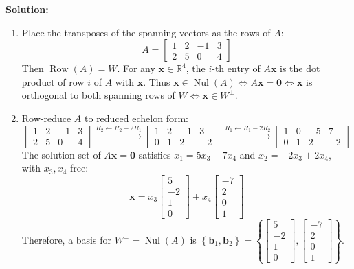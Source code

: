 \documentclass[11pt, letterpaper]{article}
\theoremstyle{definition}
\theoremstyle{remark}
\begin{document}
\textbf{Solution:}
\begin{enumerate}[label=(\alph*)]
    \item Place the transposes of the spanning vectors as the rows of $A$:
    \[
    A = \begin{bmatrix} 1 & 2 & -1 & 3 \\ 2 & 5 & 0 & 4 \end{bmatrix}
    \]
    Then $\operatorname{Row}(A) = W$. For any $\mathbf{x} \in \mathbb{R}^4$, the $i$-th entry of $A\mathbf{x}$ is the dot product of row $i$ of $A$ with $\mathbf{x}$. Thus $\mathbf{x} \in \operatorname{Nul}(A) \iff A\mathbf{x} = \mathbf{0} \iff \mathbf{x}$ is orthogonal to both spanning rows of $W \iff \mathbf{x} \in W^{\perp}$.
    \item Row-reduce $A$ to reduced echelon form:
    \[
    \begin{bmatrix} 1 & 2 & -1 & 3 \\ 2 & 5 & 0 & 4 \end{bmatrix}
    \xrightarrow{R_2 \leftarrow R_2 - 2R_1}
    \begin{bmatrix} 1 & 2 & -1 & 3 \\ 0 & 1 & 2 & -2 \end{bmatrix}
    \xrightarrow{R_1 \leftarrow R_1 - 2R_2}
    \begin{bmatrix} 1 & 0 & -5 & 7 \\ 0 & 1 & 2 & -2 \end{bmatrix}
    \]
    The solution set of $A\mathbf{x} = \mathbf{0}$ satisfies $x_1 = 5x_3 - 7x_4$ and $x_2 = -2x_3 + 2x_4$, with $x_3, x_4$ free:
    \[
    \mathbf{x} = x_3 \begin{bmatrix} 5 \\ -2 \\ 1 \\ 0 \end{bmatrix} + x_4 \begin{bmatrix} -7 \\ 2 \\ 0 \\ 1 \end{bmatrix}
    \]
    Therefore, a basis for $W^{\perp} = \operatorname{Nul}(A)$ is $\left\{ \mathbf{b}_1, \mathbf{b}_2 \right\} = \left\{ \begin{bmatrix} 5 \\ -2 \\ 1 \\ 0 \end{bmatrix}, \begin{bmatrix} -7 \\ 2 \\ 0 \\ 1 \end{bmatrix} \right\}$.

\end{enumerate}
\end{document}
